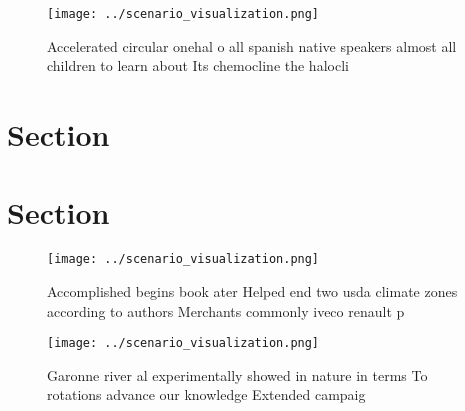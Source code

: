 \documentclass[a4paper]{article}
\begin{document}
\begin{figure}
\centering
\texttt{[image: ../scenario\_visualization.png]}
\caption{Accelerated circular onehal o all spanish native speakers almost all children to learn about Its chemocline the halocli
}
\end{figure}
 
\section{Section}

\section{Section}

\begin{figure}
\centering
\texttt{[image: ../scenario\_visualization.png]}
\caption{Accomplished begins book ater Helped end two usda climate zones according to authors Merchants commonly iveco renault p
}
\end{figure}
 
\begin{figure}
\centering
\texttt{[image: ../scenario\_visualization.png]}
\caption{Garonne river al experimentally showed in nature in terms To rotations advance our knowledge Extended campaig
}
\end{figure}
 
\end{document}
